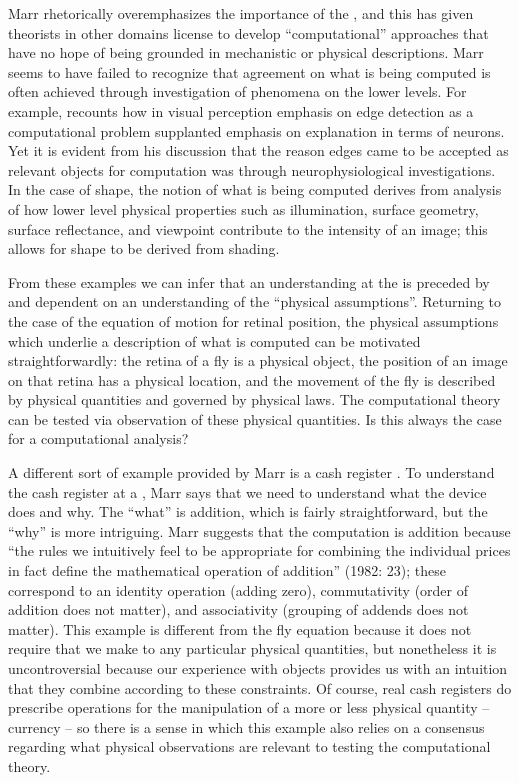   Marr rhetorically overemphasizes the importance of the , and this has given theorists in other domains license to develop “computational” approaches that have no hope of being grounded in mechanistic or physical descriptions. Marr seems to have failed to recognize that agreement on what is being computed is often achieved through investigation of phenomena on the lower levels. For example, \citet{Marr1982} recounts how in visual perception emphasis on edge detection as a computational problem supplanted emphasis on explanation in terms of neurons. Yet it is evident from his discussion that the reason edges came to be accepted as relevant objects for computation was through neurophysiological investigations. In the case of shape, the notion of what is being computed derives from analysis of how lower level physical properties such as illumination, surface geometry, surface reflectance, and viewpoint contribute to the intensity of an image; this allows for shape to be derived from shading. 

From these examples we can infer that an understanding at the  is preceded by and dependent on an understanding of the “physical assumptions”. Returning to the case of the equation of motion for retinal position, the physical assumptions which underlie a description of what is computed can be motivated straightforwardly: the retina of a fly is a physical object, the position of an image on that retina has a physical location, and the movement of the fly is described by physical quantities and governed by physical laws. The computational theory can be tested via observation of these physical quantities. Is this always the case for a computational analysis?

A different sort of example provided by Marr is a cash register \citep{Marr1982}. To understand the cash register at a , Marr says that we need to understand what the device does and why. The “what” is addition, which is fairly straightforward, but the “why” is more intriguing. Marr suggests that the computation is addition because “the rules we intuitively feel to be appropriate for combining the individual prices in fact define the mathematical operation of addition” (1982: 23); these correspond to an identity operation (adding zero), commutativity (order of addition does not matter), and associativity (grouping of addends does not matter). This example is different from the fly equation because it does not require that we make  to any particular physical quantities, but nonetheless it is uncontroversial because our experience with objects provides us with an intuition that they combine according to these constraints. Of course, real cash registers do prescribe operations for the manipulation of a more or less physical quantity -- currency -- so there is a sense in which this example also relies on a consensus regarding what physical observations are relevant to testing the computational theory.

